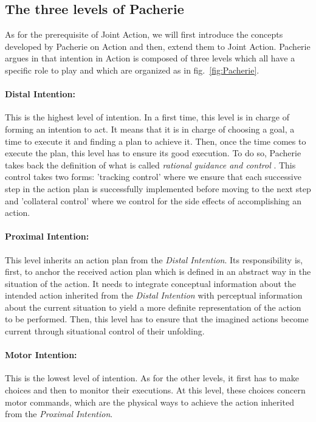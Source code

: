 \documentclass[english,a4paper,11pt,twoside]{StyleThese}
\begin{document}
\subsection{The three levels of Pacherie}

\label{subsec:Pacherie}

As for the prerequisite of Joint Action, we will first introduce the concepts developed by Pacherie on Action and then, extend them to Joint Action. Pacherie argues in \cite{pacherie2008phenomenology} that intention in Action is composed of three levels which all have a specific role to play and which are organized as in fig.~\ref{fig:Pacherie}. 

\paragraph{Distal Intention:} 
This is the highest level of intention. In a first time, this level is in charge of forming an intention to act. It means that it is in charge of choosing a goal, a time to execute it and finding a plan to achieve it. Then, once the time comes to execute the plan, this level has to ensure its good execution. To do so, Pacherie takes back the definition of what is called \textit{rational guidance and control} \cite{buekens2001indexicaliteit}. This control takes two forms: 'tracking control' where we ensure that each successive step in the action plan is successfully implemented before moving to the next step and 'collateral control' where we control for the side effects of accomplishing an action.

\paragraph{Proximal Intention:}
This level inherits an action plan from the \textit{Distal Intention}. Its responsibility is, first, to anchor the received action plan which is defined in an abstract way in the situation of the action. It needs to integrate conceptual information
about the intended action inherited from the \textit{Distal Intention} with perceptual information about the current situation to yield a more definite representation of the action to be performed. Then, this level has to ensure that the imagined actions become current through situational control of their unfolding.

\paragraph{Motor Intention:}
This is the lowest level of intention. As for the other levels, it first has to make choices and then to monitor their executions. At this level, these choices concern motor commands, which are the physical ways to achieve the action inherited from the \textit{Proximal Intention}.
\end{document}
